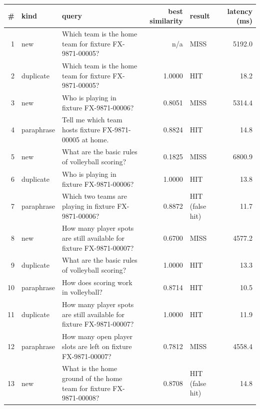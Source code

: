 \documentclass[11pt]{article}
\begin{document}
\begin{center}
{\footnotesize\setlength{\tabcolsep}{3pt}
\begin{tabular}{rl>{\raggedright\arraybackslash}p{2.55in}rlr}
\toprule
\textbf{\#} & \textbf{kind} & \textbf{query} & \textbf{best similarity} & \textbf{result} & \textbf{latency (ms)} \\
\midrule
1 & new & Which team is the home team for fixture FX-9871-00005? & n/a & MISS & 5192.0 \\
2 & duplicate & Which team is the home team for fixture FX-9871-00005? & 1.0000 & HIT & 18.2 \\
3 & new & Who is playing in fixture FX-9871-00006? & 0.8051 & MISS & 5314.4 \\
4 & paraphrase & Tell me which team hosts fixture FX-9871-00005 at home. & 0.8824 & HIT & 14.8 \\
5 & new & What are the basic rules of volleyball scoring? & 0.1825 & MISS & 6800.9 \\
6 & duplicate & Who is playing in fixture FX-9871-00006? & 1.0000 & HIT & 13.8 \\
7 & paraphrase & Which two teams are playing in fixture FX-9871-00006? & 0.8872 & HIT (false hit) & 11.7 \\
8 & new & How many player spots are still available for fixture FX-9871-00007? & 0.6700 & MISS & 4577.2 \\
9 & duplicate & What are the basic rules of volleyball scoring? & 1.0000 & HIT & 13.3 \\
10 & paraphrase & How does scoring work in volleyball? & 0.8714 & HIT & 10.5 \\
11 & duplicate & How many player spots are still available for fixture FX-9871-00007? & 1.0000 & HIT & 11.9 \\
12 & paraphrase & How many open player slots are left on fixture FX-9871-00007? & 0.7812 & MISS & 4558.4 \\
13 & new & What is the home ground of the home team for fixture FX-9871-00008? & 0.8708 & HIT (false hit) & 14.8 \\
\bottomrule
\end{tabular}}
\end{center}
\end{document}
